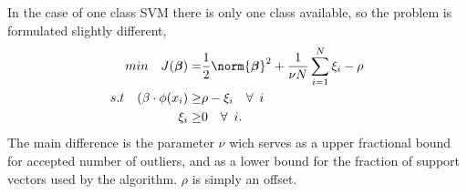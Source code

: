             In the case of one class SVM \cite{Shcolkopf} there is only one class available, so the problem is formulated slightly different,
            \begin{align}
                min \quad J(\bm \beta) = & \frac{1}{2}\norm{\bm \beta}^2  + \frac{1}{\nu N}\sum_{i=1}^N \xi_i - \rho \nonumber \\
                s.t \quad (\beta \cdot \phi(x_i) \geq & \rho - \xi_i \quad \forall \enspace i \nonumber \\
                \xi_i \geq & 0 \quad \forall \enspace i.
                \label{svm:cost}
            \end{align}
            The main difference is the parameter $\nu$ wich serves as a upper fractional bound for accepted number of outliers, and as a lower bound for the fraction of support vectors used by the algorithm. $\rho$ is simply an offset.   
            
        
    
        
        
